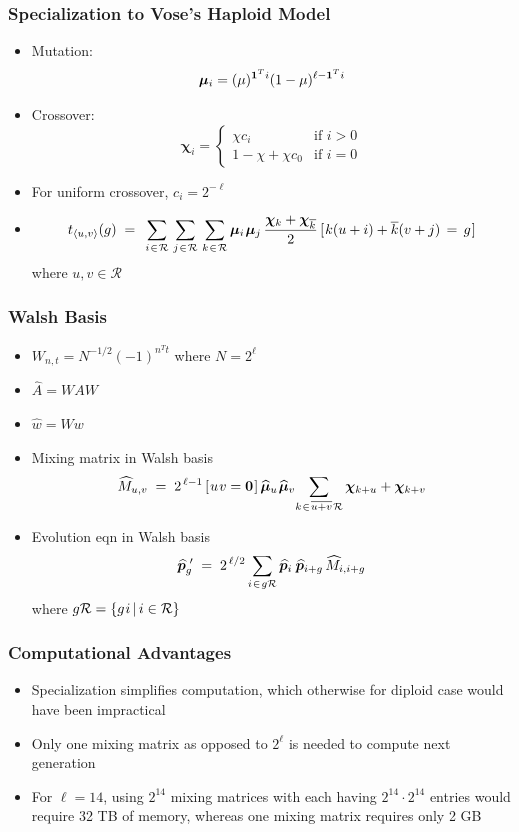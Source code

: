\documentclass[aspectratio=169]{beamer}
\newcommand{\nudge}{\hspace{0.01in}}
\begin{document}
  \begin{frame}
    \frametitle{Specialization to Vose's Haploid Model}
    \begin{itemize}
      \item{Mutation: \[\bm{\mu}_i = (\mu)^{{\bf 1}^Ti} (1-\mu)^{\ell- {\bf 1}^Ti} \]}
      \item{Crossover: \[
	\bm{\chi}_i =\begin{cases}
	  \chi c_i & \text{if $i>0$}\\
	  1 - \chi + \chi  c_0 & \text{if $i = 0$}
	\end{cases}
      \]}
      \item{For uniform crossover, $c_i = 2^{-\ell}$}
      \item{\[ t_{\langle u,v \rangle}(g) \; = \;\,
      \sum_{i \nudge \in \nudge \mathcal{R}} \, \sum_{j \nudge \in \nudge \mathcal{R}} \,
      \sum_{k \nudge \in \nudge \mathcal{R}}
      \bm{\mu}_i \nudge \bm{\mu}_j \, \frac{\bm{\chi}_k + \bm{\chi}_{\overline{k}}}{2} \,
      [\nudge k (u + i) + \overline{k}(v + j) \, = \, g\nudge] \] where $u,v \in \mathcal{R}$}
      
    \end{itemize}
  \end{frame}
  
  \begin{frame}
    \frametitle{Walsh Basis}
    \begin{itemize}
	\item{$W_{n,t} = N^{-1/2} (-1)^{n^T t}$ where $N = 2^\ell$}
	\item{$\widehat{A} = WAW$}
	\item{$\widehat{w} = Ww$}
	\item{Mixing matrix in Walsh basis 
	\[
	  \widehat{M}_{u,v} \; = \; 2^{\,\ell-1} \,[\nudge u \nudge v = {\bf
	  0}\nudge]\, \widehat{\bm{\mu}}_u \nudge \widehat{\bm{\mu}}_v \!  \sum_{k
	\nudge \in \nudge \overline{u+v} \nudge \mathcal{R}} \bm{\chi}_{k + u} +
	\bm{\chi}_{k + v}
	\]
	}
	\item{Evolution eqn in Walsh basis 
	\[
	  \widehat{\bm{p}}_g^{\,\,\prime} \; = \; 2^{\,\ell/2} \sum_{i \nudge \in \nudge g \mathcal{R}}
	  \widehat{\bm{p}}_i \, \nudge \widehat{\bm{p}}_{i+g} \,\widehat{M}_{i,i+g}
	\]
	 where $g \mathcal{R} = \{g \nudge i \, | \, i \in \mathcal{R} \}$
	}
    \end{itemize}
  \end{frame}
  
  \begin{frame}
    \frametitle{Computational Advantages}
    \begin{itemize}
      \item{Specialization simplifies computation, which otherwise for diploid case would have been impractical} 
      \item{Only one mixing matrix as opposed to $2^\ell$ is needed to compute next generation}
      \item{For $\ell = 14$, using $2^14$ mixing matrices with each having $2^14 \cdot 2^14$ 
      entries would require 32 TB of memory, whereas one mixing matrix requires only 2 GB}
    \end{itemize}
  \end{frame}
  
\end{document}
